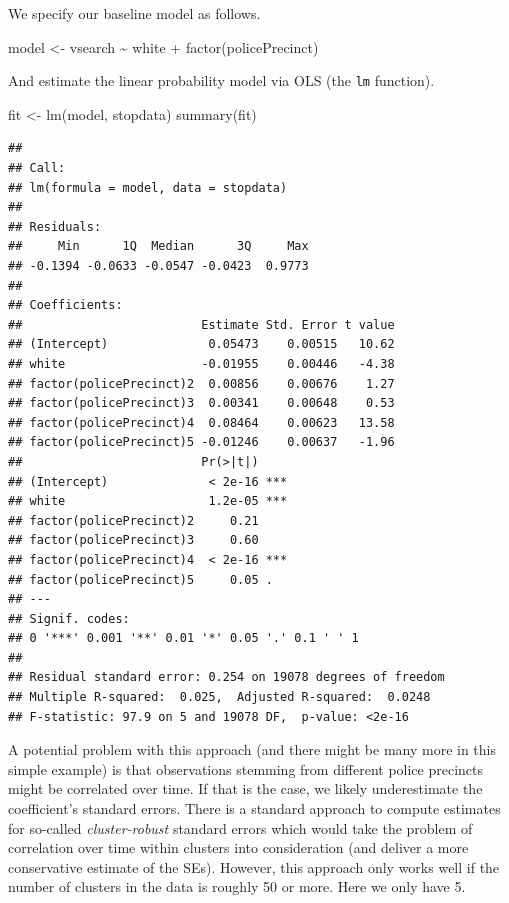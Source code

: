 \documentclass[
  12pt,
]{style/krantz}
\newenvironment{Shaded}{\begin{snugshade}}{\end{snugshade}}
\newcommand{\FunctionTok}[1]{\textcolor[rgb]{0.00,0.00,0.00}{#1}}
\newcommand{\NormalTok}[1]{#1}
\newcommand{\OtherTok}[1]{\textcolor[rgb]{0.56,0.35,0.01}{#1}}
\newcommand{\SpecialCharTok}[1]{\textcolor[rgb]{0.00,0.00,0.00}{#1}}
\begin{document}
We specify our baseline model as follows.

\begin{Shaded}
\begin{Highlighting}[]
\NormalTok{model }\OtherTok{\textless{}{-}}\NormalTok{ vsearch }\SpecialCharTok{\textasciitilde{}}\NormalTok{ white }\SpecialCharTok{+} \FunctionTok{factor}\NormalTok{(policePrecinct)}
\end{Highlighting}
\end{Shaded}

And estimate the linear probability model via OLS (the \texttt{lm} function).

\begin{Shaded}
\begin{Highlighting}[]
\NormalTok{fit }\OtherTok{\textless{}{-}} \FunctionTok{lm}\NormalTok{(model, stopdata)}
\FunctionTok{summary}\NormalTok{(fit)}
\end{Highlighting}
\end{Shaded}

\begin{verbatim}
## 
## Call:
## lm(formula = model, data = stopdata)
## 
## Residuals:
##     Min      1Q  Median      3Q     Max 
## -0.1394 -0.0633 -0.0547 -0.0423  0.9773 
## 
## Coefficients:
##                         Estimate Std. Error t value
## (Intercept)              0.05473    0.00515   10.62
## white                   -0.01955    0.00446   -4.38
## factor(policePrecinct)2  0.00856    0.00676    1.27
## factor(policePrecinct)3  0.00341    0.00648    0.53
## factor(policePrecinct)4  0.08464    0.00623   13.58
## factor(policePrecinct)5 -0.01246    0.00637   -1.96
##                         Pr(>|t|)    
## (Intercept)              < 2e-16 ***
## white                    1.2e-05 ***
## factor(policePrecinct)2     0.21    
## factor(policePrecinct)3     0.60    
## factor(policePrecinct)4  < 2e-16 ***
## factor(policePrecinct)5     0.05 .  
## ---
## Signif. codes:  
## 0 '***' 0.001 '**' 0.01 '*' 0.05 '.' 0.1 ' ' 1
## 
## Residual standard error: 0.254 on 19078 degrees of freedom
## Multiple R-squared:  0.025,  Adjusted R-squared:  0.0248 
## F-statistic: 97.9 on 5 and 19078 DF,  p-value: <2e-16
\end{verbatim}

A potential problem with this approach (and there might be many more in this simple example) is that observations stemming from different police precincts might be correlated over time. If that is the case, we likely underestimate the coefficient's standard errors. There is a standard approach to compute estimates for so-called \emph{cluster-robust} standard errors which would take the problem of correlation over time within clusters into consideration (and deliver a more conservative estimate of the SEs). However, this approach only works well if the number of clusters in the data is roughly 50 or more. Here we only have 5.
\end{document}

